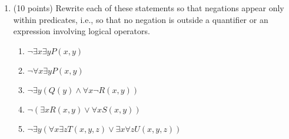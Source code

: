 \documentclass[11pt]{article}
\begin{document}
\begin{enumerate}
\item (10 points) Rewrite each of these statements so that negations appear only within predicates, i.e., so that no negation is outside a quantifier or an expression involving logical operators.
\begin{enumerate}
\item $\lnot\exists x \exists y P(x,y)$
\item $\lnot\forall x \exists y P(x,y)$
\item $\lnot\exists y (Q(y) \land \forall x \lnot R(x,y))$
\item $\lnot(\exists x R(x,y) \lor \forall x S(x,y))$
\item $\lnot\exists y (\forall x \exists z T(x,y,z) \lor \exists x \forall z U(x,y,z))$
\end{enumerate}

\end{enumerate}
\end{document}

